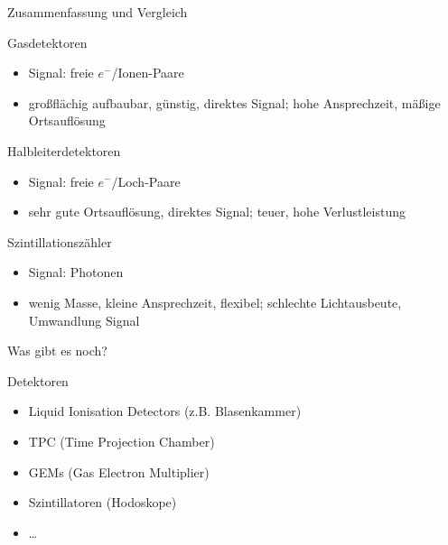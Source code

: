 

\begin{frame}{Zusammenfassung und Vergleich}
	
	\begin{block}{Gasdetektoren}
			\begin{itemize}
		  \item Signal: freie $e^-$/Ionen-Paare
		  \item großflächig aufbaubar, günstig, direktes Signal; hohe Ansprechzeit, mäßige Ortsauflösung
		\end{itemize}
	\end{block}
	\begin{block}{Halbleiterdetektoren}
			\begin{itemize}
		  \item Signal: freie $e^-$/Loch-Paare
		  \item sehr gute Ortsauflösung, direktes Signal; teuer, hohe Verlustleistung
		\end{itemize}
	\end{block}
	\begin{block}{Szintillationszähler}
			\begin{itemize}
		  \item Signal: Photonen
		  \item wenig Masse, kleine Ansprechzeit, flexibel; schlechte Lichtausbeute, Umwandlung Signal
		\end{itemize}
	\end{block}

\end{frame}


\begin{frame}{Was gibt es noch?}
	
	\begin{block}{Detektoren}
		\begin{itemize}
		  \item Liquid Ionisation Detectors (z.B. Blasenkammer)
		  \item TPC (Time Projection Chamber)
		  \item GEMs (Gas Electron Multiplier)
		  \item Szintillatoren (Hodoskope)
		  \item \ldots
		\end{itemize}
	\end{block}
	
	

\end{frame}